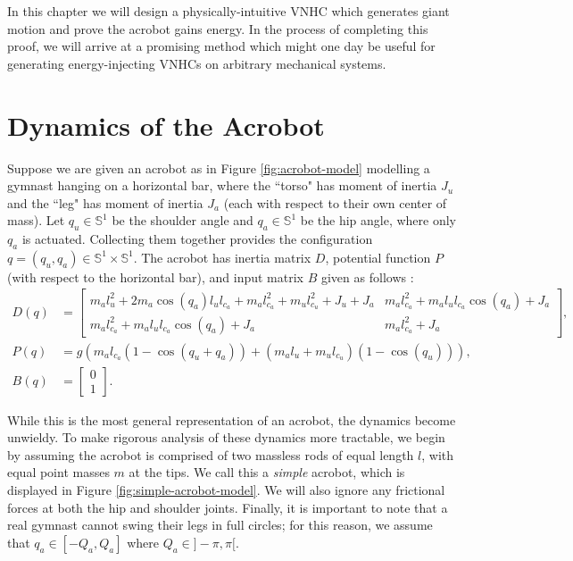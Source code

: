 In this chapter we will design a physically-intuitive VNHC which generates giant
motion and prove the acrobot gains energy. 
In the process of completing this proof, we will arrive at a promising method
which might one day be useful for generating energy-injecting VNHCs on arbitrary
mechanical systems.

\section{Dynamics of the Acrobot}
Suppose we are given an acrobot as in Figure \ref{fig:acrobot-model} modelling a
gymnast hanging on a horizontal bar, where the ``torso" has moment of
inertia \(J_u\) and the ``leg" has moment of inertia \(J_a\) (each with respect
to their own center of mass).
Let \(q_u \in \mathbb{S}^1\) be the shoulder angle and \(q_a \in \mathbb{S}^1\) 
be the hip angle, where only \(q_a\) is actuated. 
Collecting them together provides the configuration
\(q = (q_u,q_a) \in \mathbb{S}^1 \times \mathbb{S}^1\). 
The acrobot has inertia matrix \(D\), potential function \(P\) (with respect to
the horizontal bar), and input matrix \(B\)  given as
follows \cite{xingbo_thesis}:
\begin{align}\label{eqn:general-acrobot-inertia}
    D(q) &= \begin{bmatrix}
      m_al_u^2 + 2m_a\cos(q_a)l_u l_{c_a} + m_al_{c_a}^2 + m_ul_{c_u}^2 + J_u + J_a &
      m_al_{c_a}^2 + m_al_ul_{c_a}\cos(q_a) + J_a \\
      m_al_{c_a}^2 + m_al_ul_{c_a}\cos(q_a) + J_a &
      m_al_{c_a}^2 + J_a
    \end{bmatrix} 
    , \\
    \label{eqn:general-acrobot-potential}
    P(q) &= g\left(m_al_{c_a}(1 - \cos(q_u+q_a)) + 
        (m_al_u + m_ul_{c_u})(1-\cos(q_u))\right) 
    , \\
    B(q) &= \begin{bmatrix} 0 \\ 1 \end{bmatrix}
    .
\end{align}

While this is the most general representation of an acrobot, the dynamics
become unwieldy.
To make rigorous analysis of these dynamics more tractable, we begin by assuming
the acrobot is comprised of two massless rods of equal length \(l\), with equal
point masses \(m\) at the tips.
We call this a \textit{simple} acrobot, which is displayed in Figure
\ref{fig:simple-acrobot-model}.
We will also ignore any frictional forces at both the hip and shoulder joints. 
Finally, it is important to note that a real gymnast cannot swing their legs in
full circles; 
for this reason, we assume that \(q_a \in [-Q_a, Q_a]\) where 
\(Q_a \in ]-\pi, \pi[\). 

